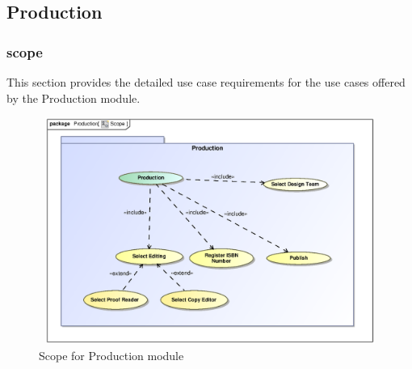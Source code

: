 \clearpage
\subsection{Production}

\subsubsection{scope}
\par{This section provides the detailed use case requirements for the use cases offered by the Production
module.}

\begin{figure}[h]
	\includegraphics[height=280px, width=500px]{epsImages/Production/Scope.eps}
	\caption{Scope for Production module}
\end{figure}

\newpage
